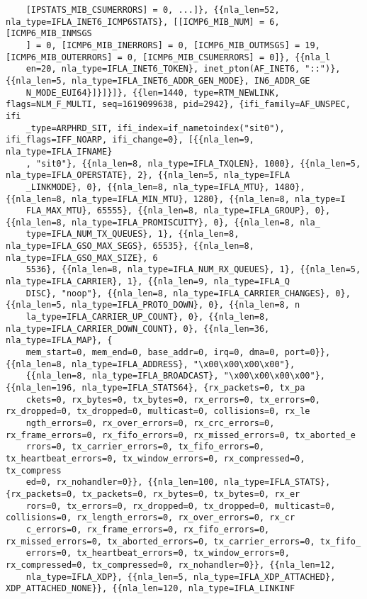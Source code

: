 \documentclass[pdf, unicode, 12pt, a4paper,oneside,fleqn]{article}
\begin{document}
{\begin{verbatim}
    [IPSTATS_MIB_CSUMERRORS] = 0, ...]}, {{nla_len=52, nla_type=IFLA_INET6_ICMP6STATS}, [[ICMP6_MIB_NUM] = 6, [ICMP6_MIB_INMSGS
    ] = 0, [ICMP6_MIB_INERRORS] = 0, [ICMP6_MIB_OUTMSGS] = 19, [ICMP6_MIB_OUTERRORS] = 0, [ICMP6_MIB_CSUMERRORS] = 0]}, {{nla_l
    en=20, nla_type=IFLA_INET6_TOKEN}, inet_pton(AF_INET6, "::")}, {{nla_len=5, nla_type=IFLA_INET6_ADDR_GEN_MODE}, IN6_ADDR_GE
    N_MODE_EUI64}]}]}]}, {{len=1440, type=RTM_NEWLINK, flags=NLM_F_MULTI, seq=1619099638, pid=2942}, {ifi_family=AF_UNSPEC, ifi
    _type=ARPHRD_SIT, ifi_index=if_nametoindex("sit0"), ifi_flags=IFF_NOARP, ifi_change=0}, [{{nla_len=9, nla_type=IFLA_IFNAME}
    , "sit0"}, {{nla_len=8, nla_type=IFLA_TXQLEN}, 1000}, {{nla_len=5, nla_type=IFLA_OPERSTATE}, 2}, {{nla_len=5, nla_type=IFLA
    _LINKMODE}, 0}, {{nla_len=8, nla_type=IFLA_MTU}, 1480}, {{nla_len=8, nla_type=IFLA_MIN_MTU}, 1280}, {{nla_len=8, nla_type=I
    FLA_MAX_MTU}, 65555}, {{nla_len=8, nla_type=IFLA_GROUP}, 0}, {{nla_len=8, nla_type=IFLA_PROMISCUITY}, 0}, {{nla_len=8, nla_
    type=IFLA_NUM_TX_QUEUES}, 1}, {{nla_len=8, nla_type=IFLA_GSO_MAX_SEGS}, 65535}, {{nla_len=8, nla_type=IFLA_GSO_MAX_SIZE}, 6
    5536}, {{nla_len=8, nla_type=IFLA_NUM_RX_QUEUES}, 1}, {{nla_len=5, nla_type=IFLA_CARRIER}, 1}, {{nla_len=9, nla_type=IFLA_Q
    DISC}, "noop"}, {{nla_len=8, nla_type=IFLA_CARRIER_CHANGES}, 0}, {{nla_len=5, nla_type=IFLA_PROTO_DOWN}, 0}, {{nla_len=8, n
    la_type=IFLA_CARRIER_UP_COUNT}, 0}, {{nla_len=8, nla_type=IFLA_CARRIER_DOWN_COUNT}, 0}, {{nla_len=36, nla_type=IFLA_MAP}, {
    mem_start=0, mem_end=0, base_addr=0, irq=0, dma=0, port=0}}, {{nla_len=8, nla_type=IFLA_ADDRESS}, "\x00\x00\x00\x00"}, 
    {{nla_len=8, nla_type=IFLA_BROADCAST}, "\x00\x00\x00\x00"}, {{nla_len=196, nla_type=IFLA_STATS64}, {rx_packets=0, tx_pa
    ckets=0, rx_bytes=0, tx_bytes=0, rx_errors=0, tx_errors=0, rx_dropped=0, tx_dropped=0, multicast=0, collisions=0, rx_le
    ngth_errors=0, rx_over_errors=0, rx_crc_errors=0, rx_frame_errors=0, rx_fifo_errors=0, rx_missed_errors=0, tx_aborted_e
    rrors=0, tx_carrier_errors=0, tx_fifo_errors=0, tx_heartbeat_errors=0, tx_window_errors=0, rx_compressed=0, tx_compress
    ed=0, rx_nohandler=0}}, {{nla_len=100, nla_type=IFLA_STATS}, {rx_packets=0, tx_packets=0, rx_bytes=0, tx_bytes=0, rx_er
    rors=0, tx_errors=0, rx_dropped=0, tx_dropped=0, multicast=0, collisions=0, rx_length_errors=0, rx_over_errors=0, rx_cr
    c_errors=0, rx_frame_errors=0, rx_fifo_errors=0, rx_missed_errors=0, tx_aborted_errors=0, tx_carrier_errors=0, tx_fifo_
    errors=0, tx_heartbeat_errors=0, tx_window_errors=0, rx_compressed=0, tx_compressed=0, rx_nohandler=0}}, {{nla_len=12, 
    nla_type=IFLA_XDP}, {{nla_len=5, nla_type=IFLA_XDP_ATTACHED}, XDP_ATTACHED_NONE}}, {{nla_len=120, nla_type=IFLA_LINKINF
    

\end{verbatim}}
\end{document}
